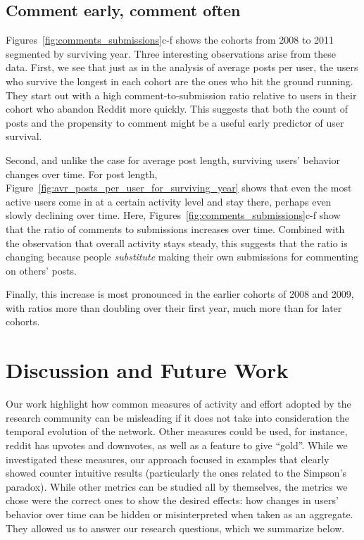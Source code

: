 \subsection{Comment early, comment often}

Figures~\ref{fig:comments_submissions}c-f shows the cohorts from 2008 to 2011 segmented by surviving year.  Three interesting observations arise from these data.  First, we see that just as in the analysis of average posts per user, the users who survive the longest in each cohort are the ones who hit the ground running.  They start out with a high comment-to-submission ratio relative to users in their cohort who abandon Reddit more quickly.  This suggests that both the count of posts and the propensity to comment might be a useful early predictor of user survival.

Second, and unlike the case for average post length, surviving users' behavior changes over time.  For post length, Figure~\ref{fig:avr_posts_per_user_for_surviving_year} shows that even the most active users come in at a certain activity level and stay there, perhaps even slowly declining over time.  Here, Figures~\ref{fig:comments_submissions}c-f show that the ratio of comments to submissions increases over time.  Combined with the observation that overall activity stays steady, this suggests that the ratio is changing because people \textit{substitute} making their own submissions for commenting on others' posts.

Finally, this increase is most pronounced in the earlier cohorts of 2008 and 2009, with ratios more than doubling over their first year, much more than for later cohorts.

\section{Discussion and Future Work}

Our work highlight how common measures of activity and effort adopted by the research community can be misleading if it does not take into consideration the temporal evolution of the network. Other measures could be used, for instance, reddit has upvotes and downvotes, as well as a feature to give ``gold''. While we investigated these measures, our approach focused in examples that clearly showed counter intuitive results (particularly the ones related to the Simpson's paradox). While other metrics can be studied all by themselves, the metrics we chose were the correct ones to show the desired effects: how changes in users' behavior over time can be hidden or misinterpreted when taken as an aggregate. They allowed us to answer our research questions, which we summarize below.

